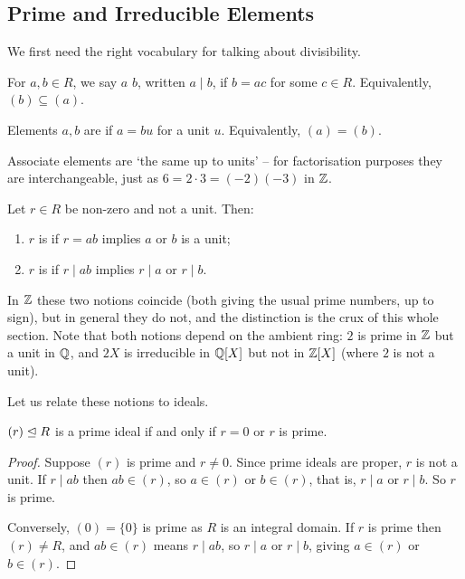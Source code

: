 \documentclass[a4paper]{scrartcl}
\begin{document}
\subsection{Prime and Irreducible Elements}

We first need the right vocabulary for talking about divisibility.

\begin{definition}
	For $a, b \in R$, we say $a$  $b$, written $a \mid b$, if $b = ac$ for some $c \in R$. Equivalently, $(b) \subseteq (a)$.

	Elements $a, b$ are  if $a = bu$ for a unit $u$. Equivalently, $(a) = (b)$.
\end{definition}

Associate elements are `the same up to units' -- for factorisation purposes they are interchangeable, just as $6 = 2 \cdot 3 = (-2)(-3)$ in $\mathbb{Z}$.

\begin{definition}
	Let $r \in R$ be non-zero and not a unit. Then:
	\begin{enumerate}[label=(\roman*)]
		\item $r$ is  if $r = ab$ implies $a$ or $b$ is a unit;
		\item $r$ is  if $r \mid ab$ implies $r \mid a$ or $r \mid b$.
	\end{enumerate}
\end{definition}

In $\mathbb{Z}$ these two notions coincide (both giving the usual prime numbers, up to sign), but in general they do not, and the distinction is the crux of this whole section. Note that both notions depend on the ambient ring: $2$ is prime in $\mathbb{Z}$ but a unit in $\mathbb{Q}$, and $2X$ is irreducible in $\mathbb{Q}[X]$ but not in $\mathbb{Z}[X]$ (where $2$ is not a unit).

Let us relate these notions to ideals.

\begin{lemma}
	$(r) \trianglelefteq R$ is a prime ideal if and only if $r = 0$ or $r$ is prime.
\end{lemma}
\begin{proof}
	Suppose $(r)$ is prime and $r \neq 0$. Since prime ideals are proper, $r$ is not a unit. If $r \mid ab$ then $ab \in (r)$, so $a \in (r)$ or $b \in (r)$, that is, $r \mid a$ or $r \mid b$. So $r$ is prime.

	Conversely, $(0) = \{0\}$ is prime as $R$ is an integral domain. If $r$ is prime then $(r) \neq R$, and $ab \in (r)$ means $r \mid ab$, so $r \mid a$ or $r \mid b$, giving $a \in (r)$ or $b \in (r)$.
\end{proof}
\end{document}
